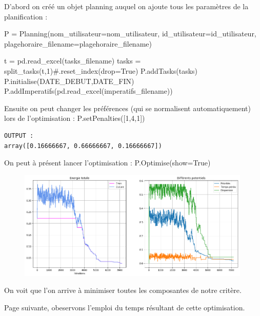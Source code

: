 \documentclass[12pt]{article}
\newenvironment{code}%
   {\snugshade\verbatim}%
   {\endverbatim\endsnugshade}
\begin{document}
D'abord on créé un objet planning auquel on ajoute tous les paramètres de la planification :

\begin{code}
P = Planning(nom_utilisateur=nom_utilisateur,
        id_utilisateur=id_utilisateur,
        plagehoraire_filename=plagehoraire_filename)

t = pd.read_excel(tasks_filename)
tasks = split_tasks(t,1)#.reset_index(drop=True)
P.addTasks(tasks)
P.initialise(DATE_DEBUT,DATE_FIN)
P.addImperatifs(pd.read_excel(imperatifs_filename))
\end{code}

Ensuite on peut changer les préférences (qui se normalisent automatiquement) lors de l'optimisation :
\begin{code}
P.setPenalties([1,4,1])
\end{code}
\begin{verbatim}
OUTPUT :
array([0.16666667, 0.66666667, 0.16666667])
\end{verbatim}

On peut à présent lancer l'optimisation :
\begin{code}
P.Optimise(show=True)
\end{code}


\begin{figure}[H]
\begin{center}
\includegraphics[width=0.99\textwidth]{oedt1}
\end{center}
\end{figure}

On voit que l'on arrive à minimiser toutes les composantes de notre critère.

Page suivante, obeservons l'emploi du temps résultant de cette optimisation.
\end{document}
